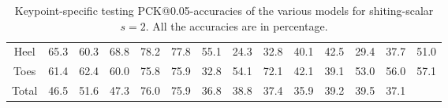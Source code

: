 \documentclass[./main.tex]{subfiles}
\begin{document}
\begin{table}[htbp]
\begin{adjustbox}{center}
\begin{tabular}{c||ccc|ccc|ccc|ccc|c}
            Heel & 65.3 & 60.3 & 68.8 & 78.2 & 77.8 & 55.1 & 24.3 & 32.8 & 40.1 & 42.5 & 29.4 & 37.7 & 51.0 \\
            Toes & 61.4 & 62.4 & 60.0 & 75.8 & 75.9 & 32.8 & 54.1 & 72.1 & 42.1 & 39.1 & 53.0 & 56.0 & 57.1 \\
            \hline
            Total & 46.5 & 51.6 & 47.3 & 76.0 & 75.9 & 36.8 & 38.8 & 37.4 & 35.9 & 39.2 & 39.5 & 37.1 & \\
            \hline
        \end{tabular}
        \caption{Keypoint-specific testing PCK@0.05-accuracies of the various models for shiting-scalar $s = 2$. All the accuracies are in percentage.}
        \label{tab:finetune_kpts_test_accs_05_2}
    \end{adjustbox}
\end{table}
\end{document}

